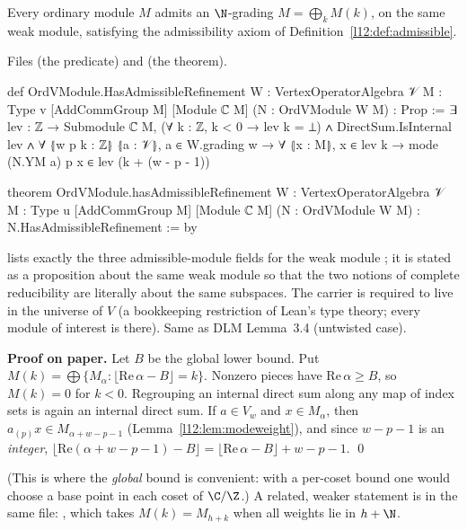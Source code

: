 \begin{theorem}[Ordinary $\subseteq$ admissible; Dong--Li--Mason, Lemma~3.4 at $g=1$]\label{l12:thm:ordadm}
Every ordinary module $M$ admits an $\N$-grading $M = \bigoplus_kM(k)$, on the same weak module,
satisfying the admissibility axiom of Definition~\ref{l12:def:admissible}.
\end{theorem}
\noindent Files  (the predicate) and
 (the theorem).
\begin{leancode}
def OrdVModule.HasAdmissibleRefinement {W : VertexOperatorAlgebra 𝒱} {M : Type v}
    [AddCommGroup M] [Module ℂ M] (N : OrdVModule W M) : Prop :=
  ∃ lev : ℤ → Submodule ℂ M,
    (∀ k : ℤ, k < 0 → lev k = ⊥) ∧ DirectSum.IsInternal lev ∧
      ∀ ⦃w p k : ℤ⦄ ⦃a : 𝒱⦄, a ∈ W.grading w → ∀ ⦃x : M⦄, x ∈ lev k →
        mode (N.YM a) p x ∈ lev (k + (w - p - 1))

theorem OrdVModule.hasAdmissibleRefinement {W : VertexOperatorAlgebra 𝒱} {M : Type u}
    [AddCommGroup M] [Module ℂ M] (N : OrdVModule W M) : N.HasAdmissibleRefinement := by
\end{leancode}

\begin{dictionary}
 lists exactly the three admissible-module fields for the weak module
; it is stated as a proposition about the same weak module so that the two notions of
complete reducibility are literally about the same subspaces. The carrier is required to live in the
universe  of $V$ (a bookkeeping restriction of Lean's type theory; every module of interest is
there). Same as DLM Lemma~3.4 (untwisted case).
\end{dictionary}

\textbf{Proof on paper.} Let $B$ be the global lower bound. Put $M(k) = \bigoplus\{M_\alpha :
\lfloor\mathrm{Re}\,\alpha - B\rfloor = k\}$. Nonzero pieces have $\mathrm{Re}\,\alpha\ge B$, so $M(k) = 0$ for
$k<0$. Regrouping an internal direct sum along any map of index sets is again an internal direct sum. If
$a\in V_w$ and $x\in M_\alpha$, then $a_{(p)}x\in M_{\alpha+w-p-1}$ (Lemma~\ref{l12:lem:modeweight}), and since
$w-p-1$ is an \emph{integer}, $\lfloor\mathrm{Re}(\alpha+w-p-1)-B\rfloor = \lfloor\mathrm{Re}\,\alpha-B\rfloor
+ w-p-1$. \qed

(This is where the \emph{global} bound is convenient: with a per-coset bound one would choose a base point
in each coset of $\C/\Z$.) A related, weaker statement is in the same file:
\allowbreak{}\allowbreak{}\allowbreak{}, which takes $M(k) = M_{h+k}$ when all weights
lie in $h+\N$.

